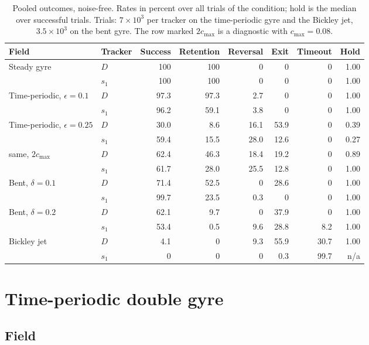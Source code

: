 \documentclass[11pt]{article}
\begin{document}
\begin{table}[t]
\centering
\caption{Pooled outcomes, noise-free. Rates in percent over all trials
of the condition; hold is the median over successful trials. Trials:
$7 \times 10^3$ per tracker on the time-periodic gyre and the Bickley jet,
$3.5 \times 10^3$ on the bent gyre. The row marked $2c_{\max}$ is a
diagnostic with $c_{\max} = 0.08$.}
\label{tab:pooled}
\begin{tabular}{llrrrrrr}
\toprule
Field & Tracker & Success & Retention & Reversal & Exit & Timeout & Hold \\
\midrule
Steady gyre & $D$ & 100 & 100 & 0 & 0 & 0 & 1.00 \\
            & $s_1$ & 100 & 100 & 0 & 0 & 0 & 1.00 \\
Time-periodic, $\epsilon=0.1$ & $D$ & 97.3 & 97.3 & 2.7 & 0 & 0 & 1.00 \\
            & $s_1$ & 96.2 & 59.1 & 3.8 & 0 & 0 & 1.00 \\
Time-periodic, $\epsilon=0.25$ & $D$ & 30.0 & 8.6 & 16.1 & 53.9 & 0 & 0.39 \\
            & $s_1$ & 59.4 & 15.5 & 28.0 & 12.6 & 0 & 0.27 \\
\quad same, $2c_{\max}$ & $D$ & 62.4 & 46.3 & 18.4 & 19.2 & 0 & 0.89 \\
            & $s_1$ & 61.7 & 28.0 & 25.5 & 12.8 & 0 & 1.00 \\
Bent, $\delta=0.1$ & $D$ & 71.4 & 52.5 & 0 & 28.6 & 0 & 1.00 \\
            & $s_1$ & 99.7 & 23.5 & 0.3 & 0 & 0 & 1.00 \\
Bent, $\delta=0.2$ & $D$ & 62.1 & 9.7 & 0 & 37.9 & 0 & 1.00 \\
            & $s_1$ & 53.4 & 0.5 & 9.6 & 28.8 & 8.2 & 1.00 \\
Bickley jet & $D$ & 4.1 & 0 & 9.3 & 55.9 & 30.7 & 1.00 \\
            & $s_1$ & 0 & 0 & 0 & 0.3 & 99.7 & n/a \\
\bottomrule
\end{tabular}
\end{table}

\section{Time-periodic double gyre}
\label{sec:tp}

\subsection{Field}
\end{document}
